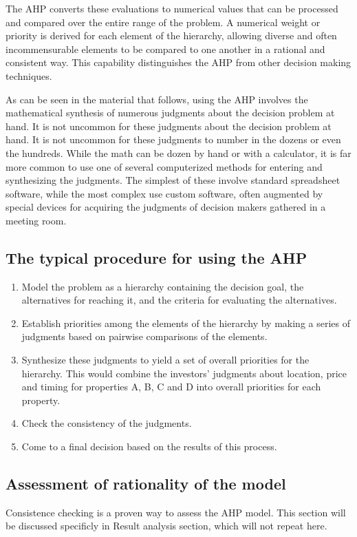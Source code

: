 	The AHP converts these evaluations to numerical values that can be processed and compared over the entire range of the problem\cite{url13}. A numerical weight or priority is derived for each element of the hierarchy, allowing diverse and often incommensurable elements to be compared to one another in a rational and consistent way\cite{url2}. This capability distinguishes the AHP from other decision making techniques\cite{url13}.

	As can be seen in the material that follows, using the AHP involves the mathematical synthesis of numerous judgments about the decision problem at hand. It is not uncommon for these judgments about the decision problem at hand\cite{url4}. It is not uncommon for these judgments to number in the dozens or even the hundreds. While the math can be dozen by hand or with a calculator, it is far more common to use one of several computerized methods for entering and synthesizing the judgments\cite{url13}. The simplest of these involve standard spreadsheet software, while the most complex use custom software, often augmented by special devices for acquiring the judgments of decision makers gathered in a meeting room\cite{url13}.

\subsection{The typical procedure for using the AHP}

\begin{enumerate}
\item Model the problem as a hierarchy containing the decision goal, the alternatives for reaching it, and the criteria for evaluating the alternatives.
\item Establish priorities among the elements of the hierarchy by making a series of judgments based on pairwise comparisons of the elements.
\item Synthesize these judgments to yield a set of overall priorities for the hierarchy. This would combine the investors' judgments about location, price and timing for properties A, B, C and D into overall priorities for each property.
\item Check the consistency of the judgments.
\item Come to a final decision based on the results of this process.
\end{enumerate}

\subsection{Assessment of rationality of the model}
Consistence checking is a proven way to assess the AHP model. This section will be discussed specificly in Result analysis section, which will not repeat here.

